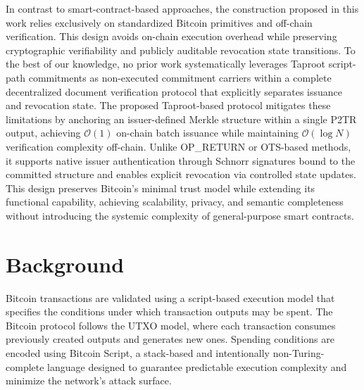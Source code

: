 \documentclass[preprint,12pt]{elsarticle}
\begin{document}
In contrast to smart-contract-based approaches, the construction proposed in this work relies exclusively on standardized Bitcoin primitives and off-chain verification. This design avoids on-chain execution overhead while preserving cryptographic verifiability and publicly auditable revocation state transitions. To the best of our knowledge, no prior work systematically leverages Taproot script-path commitments as non-executed commitment carriers within a complete decentralized document verification protocol that explicitly separates issuance and revocation state. The proposed Taproot-based protocol mitigates these limitations by anchoring an issuer-defined Merkle structure within a single P2TR output, achieving $\mathcal{O}(1)$ on-chain batch issuance while maintaining $\mathcal{O}(\log N)$ verification complexity off-chain. Unlike OP\_RETURN or OTS-based methods, it supports native issuer authentication through Schnorr signatures bound to the committed structure and enables explicit revocation via controlled state updates. This design preserves Bitcoin’s minimal trust model while extending its functional capability, achieving scalability, privacy, and semantic completeness without introducing the systemic complexity of general-purpose smart contracts.






\section{Background}
\label{sec.background}


Bitcoin transactions are validated using a script-based execution model that specifies the conditions under which transaction outputs may be spent. 
The Bitcoin protocol follows the UTXO model, where each transaction consumes previously created outputs and generates new ones. Spending conditions are encoded using Bitcoin Script, a stack-based and intentionally non-Turing-complete language designed to guarantee predictable execution complexity and minimize the network's attack surface. 
\end{document}
